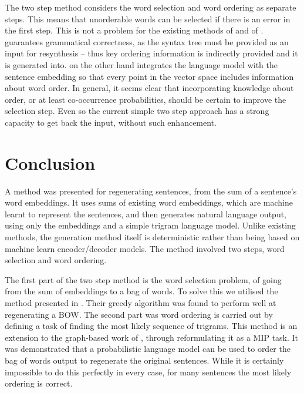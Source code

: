 \documentclass[compsoc]{IEEEtran}
\theoremstyle{plain}
\theoremstyle{definition}
\begin{document}
The two step method considers the word selection and word ordering as separate steps. This means that unorderable words can be selected if there is an error in the first step. This is not a problem for the existing methods of \textcite{iyyer2014generating} and of \textcite{Bowman2015SmoothGeneration}. \textcite{iyyer2014generating} guarantees grammatical correctness, as the syntax tree must be provided as an input for resynthesis -- thus key ordering information is indirectly provided and it is generated into. \textcite{Bowman2015SmoothGeneration} on the other hand integrates the language model with the sentence embedding so that every point in the vector space includes information about word order. In general, it seems clear that incorporating knowledge about order, or at least co-occurrence probabilities, should be certain to improve the selection step. Even so the current simple two step approach has a strong capacity to get back the input, without such enhancement.


\section{Conclusion} \label{conclusion}
A method was presented for regenerating sentences, from the sum of a sentence's word embeddings. It uses sums of existing word embeddings, which are machine learnt to represent the sentences, and then generates natural language output, using only the embeddings and a simple trigram language model. Unlike existing methods, the generation method itself is deterministic rather than being based on machine learn encoder/decoder models. The method involved two steps, word selection and word ordering.

The first part of the two step method is  the word selection problem, of going from the sum of embeddings to a bag of words. To solve this we utilised the method presented in \textcite{White2015BOWgen}. Their greedy algorithm was found to perform well at regenerating a BOW. The second part was word ordering is carried out by defining a task of finding the most likely sequence of trigrams. This method is an extension to the graph-based work of \textcite{Horvat2014}, through reformulating it as a MIP task. It was demonstrated that a probabilistic language model can be used to order the bag of words output to regenerate the original sentences. While it is certainly impossible to do this perfectly in every case, for many sentences the most likely ordering is correct.
\end{document}
